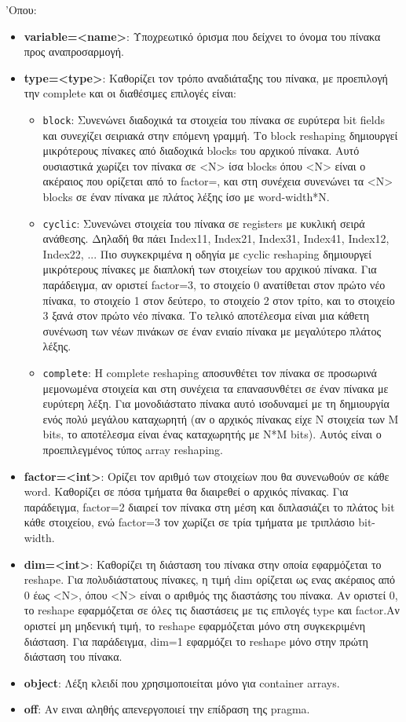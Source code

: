 'Οπου:
\begin{itemize}
  \item \textbf{variable=<name>}: Υποχρεωτικό όρισμα που δείχνει το όνομα του πίνακα προς αναπροσαρμογή.
  \item \textbf{type=<type>}: Καθορίζει τον τρόπο αναδιάταξης του πίνακα, με προεπιλογή την complete και οι διαθέσιμες επιλογές είναι:
  \begin{itemize}
    \item \texttt{block}: Συνενώνει διαδοχικά τα στοιχεία του πίνακα σε ευρύτερα bit fields και συνεχίζει σειριακά στην επόμενη γραμμή.
    Το block reshaping δημιουργεί μικρότερους πίνακες από διαδοχικά blocks του αρχικού πίνακα. Αυτό ουσιαστικά χωρίζει τον πίνακα σε <N> ίσα blocks όπου <N> είναι ο
    ακέραιος που ορίζεται από το factor=, και στη συνέχεια συνενώνει τα <N> blocks σε έναν πίνακα με πλάτος λέξης ίσο με word-width*N.
    \item \texttt{cyclic}: Συνενώνει στοιχεία του πίνακα σε registers με κυκλική σειρά ανάθεσης. Δηλαδή θα πάει Index11, Index21, Index31, Index41, Index12, Index22, ...
    Πιο συγκεκριμένα η οδηγία με cyclic reshaping δημιουργεί μικρότερους πίνακες με διαπλοκή των στοιχείων του αρχικού πίνακα.
    Για παράδειγμα, αν οριστεί factor=3, το στοιχείο 0 ανατίθεται στον πρώτο νέο πίνακα, το στοιχείο 1 στον δεύτερο, το στοιχείο 2 στον τρίτο, και το στοιχείο 3 ξανά στον πρώτο νέο πίνακα.
      Το τελικό αποτέλεσμα είναι μια κάθετη συνένωση των νέων πινάκων σε έναν ενιαίο πίνακα με μεγαλύτερο πλάτος λέξης.
      \item \texttt{complete}: Η complete reshaping αποσυνθέτει τον πίνακα σε προσωρινά μεμονωμένα στοιχεία και στη συνέχεια τα επανασυνθέτει σε έναν πίνακα με ευρύτερη λέξη.
      Για μονοδιάστατο πίνακα αυτό ισοδυναμεί με τη δημιουργία ενός πολύ μεγάλου καταχωρητή (αν ο αρχικός πίνακας είχε N στοιχεία των M bits, το αποτέλεσμα είναι ένας καταχωρητής με N*M bits).
      Αυτός είναι ο προεπιλεγμένος τύπος array reshaping.
  \end{itemize}
  \item \textbf{factor=<int>}: Ορίζει τον αριθμό των στοιχείων που θα συνενωθούν σε κάθε word.
  Καθορίζει σε πόσα τμήματα θα διαιρεθεί ο αρχικός πίνακας.
  Για παράδειγμα, factor=2 διαιρεί τον πίνακα στη μέση και διπλασιάζει το πλάτος bit κάθε στοιχείου, ενώ factor=3 τον χωρίζει σε τρία τμήματα με τριπλάσιο bit-width.
  \item \textbf{dim=<int>}: Καθορίζει τη διάσταση του πίνακα στην οποία εφαρμόζεται το reshape.
  Για πολυδιάστατους πίνακες, η τιμή dim ορίζεται ως ενας ακέραιος από 0 έως <N>, όπου <N> είναι ο αριθμός της διαστάσης του πίνακα.
  Αν οριστεί 0, το reshape εφαρμόζεται σε όλες τις διαστάσεις με τις επιλογές type και factor.Αν οριστεί μη μηδενική τιμή, το reshape εφαρμόζεται μόνο στη συγκεκριμένη διάσταση. Για παράδειγμα, dim=1 εφαρμόζει το reshape μόνο στην πρώτη διάσταση του πίνακα.
  \item \textbf{object}: Λέξη κλειδί που χρησιμοποιείται μόνο για container arrays.
  \item \textbf{off}: Αν ειναι αληθής απενεργοποιεί την επίδραση της pragma.
\end{itemize}

